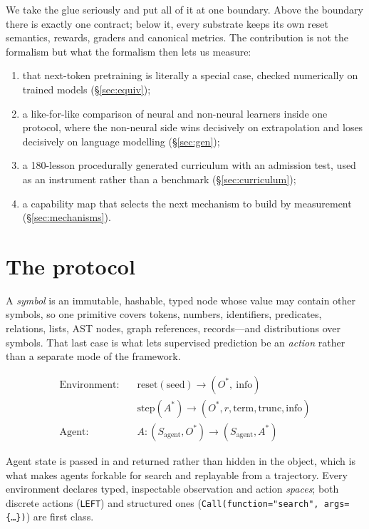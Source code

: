\documentclass[11pt]{article}
\newcommand{\code}[1]{\texttt{\small #1}}
\begin{document}
We take the glue seriously and put all of it at one boundary. Above the boundary
there is exactly one contract; below it, every substrate keeps its own reset
semantics, rewards, graders and canonical metrics. The contribution is not the
formalism but what the formalism then lets us measure:

\begin{enumerate}\itemsep2pt
\item that next-token pretraining is literally a special case, checked
      numerically on trained models (\S\ref{sec:equiv});
\item a like-for-like comparison of neural and non-neural learners inside one
      protocol, where the non-neural side wins decisively on extrapolation and
      loses decisively on language modelling (\S\ref{sec:gen});
\item a 180-lesson procedurally generated curriculum with an admission test, used
      as an instrument rather than a benchmark (\S\ref{sec:curriculum});
\item a capability map that selects the next mechanism to build by measurement
      (\S\ref{sec:mechanisms}).
\end{enumerate}

\section{The protocol}

A \emph{symbol} is an immutable, hashable, typed node whose value may contain
other symbols, so one primitive covers tokens, numbers, identifiers, predicates,
relations, lists, AST nodes, graph references, records---and distributions over
symbols. That last case is what lets supervised prediction be an \emph{action}
rather than a separate mode of the framework.

\begin{align*}
\text{Environment:}\quad & \mathrm{reset}(\text{seed}) \to (O^*,\ \text{info})\\
                         & \mathrm{step}(A^*) \to (O^*, r, \text{term}, \text{trunc}, \text{info})\\
\text{Agent:}\quad & A : (S_{\text{agent}}, O^*) \to (S_{\text{agent}}, A^*)
\end{align*}

Agent state is passed in and returned rather than hidden in the object, which is
what makes agents forkable for search and replayable from a trajectory. Every
environment declares typed, inspectable observation and action \emph{spaces};
both discrete actions (\code{LEFT}) and structured ones
(\code{Call(function="search", args=\{\ldots\})}) are first class.
\end{document}
